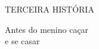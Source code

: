 



\blankpage
\pagebreak
\thispagestyle{empty}
\mbox{}
\begin{center}
\vspace{4cm}
{\formularlight\small TERCEIRA HISTÓRIA}

\medskip

{\formular\huge Antes do menino caçar\\\vspace{0.2cm} e se casar}
\end{center}
\pagebreak

